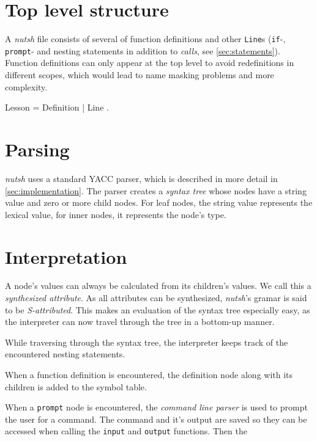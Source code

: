 \documentclass[paper=a4,twoside,abstract=on,cleardoublepage=empty,numbers=noenddot,toc=bib,12pt,appendixprefix=true]{scrreprt}
\begin{document}
\section{Top level structure}

A \emph{nutsh} file consists of several of function definitions and other \texttt{Line}s (\texttt{if}-, \texttt{prompt}- and nesting statements in addition to \emph{calls}, see \cref{sec:statements}). Function definitions can only appear at the top level to avoid redefinitions in different scopes, which would lead to name masking problems and more complexity.

\begin{ebnf}
Lesson = { Definition | Line } .
\end{ebnf}

\section{Parsing}

\emph{nutsh} uses a standard YACC parser, which is described in more detail in \cref{sec:implementation}. The parser creates a \emph{syntax tree} whose nodes have a string value and zero or more child nodes. For leaf nodes, the string value represents the lexical value, for inner nodes, it represents the node's type.

\section{Interpretation}

A node's values can always be calculated from its children's values. We call this a \emph{synthesized attribute}. As all attributes can be synthesized, \emph{nutsh}'s gramar is said to be \emph{S-attributed}. This makes an evaluation of the syntax tree especially easy, as the interpreter can now travel through the tree in a bottom-up manner.

While traversing through the syntax tree, the interpreter keeps track of the encountered nesting statements.

When a function definition is encountered, the definition node along with its children is added to the symbol table.

When a \texttt{prompt} node is encountered, the \emph{command line parser} is used to prompt the user for a command. The command and it's output are saved so they can be accessed when calling the \texttt{input} and \texttt{output} functions. Then the 
\end{document}
